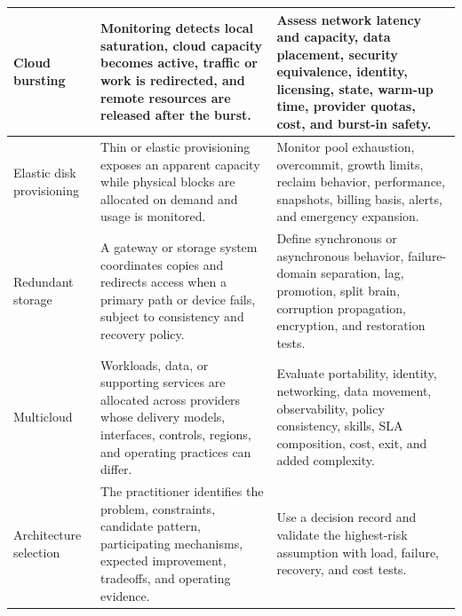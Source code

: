 \documentclass[11pt]{article}
\begin{document}
\begin{longtable}{@{}>{\RaggedRight\arraybackslash}p{}>{\RaggedRight\arraybackslash}p{}>{\RaggedRight\arraybackslash}p{}@{}}
Cloud bursting & Monitoring detects local saturation, cloud capacity becomes active, traffic or work is redirected, and remote resources are released after the burst. & Assess network latency and capacity, data placement, security equivalence, identity, licensing, state, warm-up time, provider quotas, cost, and burst-in safety. \\\midrule
Elastic disk provisioning & Thin or elastic provisioning exposes an apparent capacity while physical blocks are allocated on demand and usage is monitored. & Monitor pool exhaustion, overcommit, growth limits, reclaim behavior, performance, snapshots, billing basis, alerts, and emergency expansion. \\\midrule
Redundant storage & A gateway or storage system coordinates copies and redirects access when a primary path or device fails, subject to consistency and recovery policy. & Define synchronous or asynchronous behavior, failure-domain separation, lag, promotion, split brain, corruption propagation, encryption, and restoration tests. \\\midrule
Multicloud & Workloads, data, or supporting services are allocated across providers whose delivery models, interfaces, controls, regions, and operating practices can differ. & Evaluate portability, identity, networking, data movement, observability, policy consistency, skills, SLA composition, cost, exit, and added complexity. \\\midrule
Architecture selection & The practitioner identifies the problem, constraints, candidate pattern, participating mechanisms, expected improvement, tradeoffs, and operating evidence. & Use a decision record and validate the highest-risk assumption with load, failure, recovery, and cost tests. \\\midrule
\bottomrule
\end{longtable}
\endgroup
\end{document}
